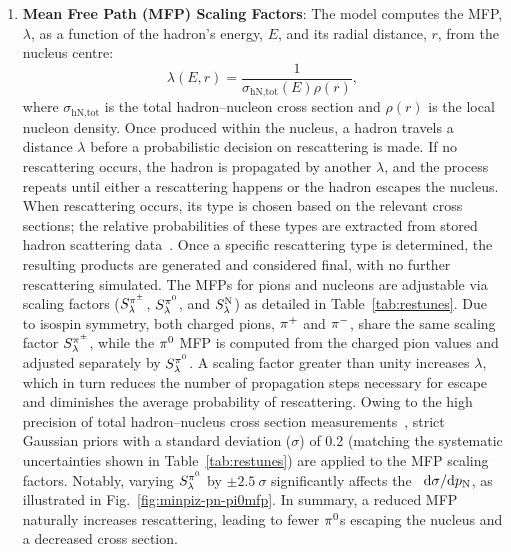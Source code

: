     \begin{enumerate}
        \item \textbf{Mean Free Path (MFP) Scaling Factors}:
        The model computes the MFP, $\lambda$, as a function of the hadron's energy, $E$, and its radial distance, $r$, from the nucleus centre:
        \begin{equation}
            \lambda(E,r) = \frac{1}{\sigma_\textrm{hN,tot}(E)\rho(r)},
        \end{equation}
        where $\sigma_\textrm{hN,tot}$ is the total hadron–nucleon cross section and $\rho(r)$ is the local nucleon density. 
        Once produced within the nucleus, a hadron travels a distance $\lambda$ before a probabilistic decision on rescattering is made. 
        If no rescattering occurs, the hadron is propagated by another $\lambda$, and the process repeats until either a rescattering happens or the hadron escapes the nucleus. 
        When rescattering occurs, its type is chosen based on the relevant cross sections; the relative probabilities of these types are extracted from stored hadron scattering data~\cite{LADS:1999dyv,Navon:1983xj,Carroll:1976hj,Clough:1974qt,BAUHOFF1986429,Mashnik:2000up,Ishibashi:1997gbe}. 
        Once a specific rescattering type is determined, the resulting products are generated and considered final, with no further rescattering simulated.
        The MFPs for pions and nucleons are adjustable via scaling factors ($S_\lambda^{\pi^{\pm}}$, $S_\lambda^{\pi^{0}}$, and $S_\lambda^\textrm{N}$) as detailed in Table~\ref{tab:restunes}. 
        Due to isospin symmetry, both charged pions, $\pi^+$ and $\pi^-$, share the same scaling factor $S_\lambda^{\pi^{\pm}}$, while the $\pi^0$ MFP is computed from the charged pion values and adjusted separately by $S_\lambda^{\pi^{0}}$. 
        A scaling factor greater than unity increases $\lambda$, which in turn reduces the number of propagation steps necessary for escape and diminishes the average probability of rescattering. 
        Owing to the high precision of total hadron–nucleus cross section measurements~\cite{LADS:1999dyv,Navon:1983xj,Carroll:1976hj,Clough:1974qt,BAUHOFF1986429}, strict Gaussian priors with a standard deviation ($\sigma$) of 0.2 (matching the systematic uncertainties shown in Table~\ref{tab:restunes}) are applied to the MFP scaling factors. 
        Notably, varying $S_\lambda^{\pi^{0}}$ by $\pm2.5~\sigma$ significantly affects the \minpiz\ $\textrm{d}\sigma/\textrm{d}p_\textrm{N}$, as illustrated in Fig.~\ref{fig:minpiz-pn-pi0mfp}. 
        In summary, a reduced MFP naturally increases rescattering, leading to fewer $\pi^0$s escaping the nucleus and a decreased cross section.

\end{enumerate}
